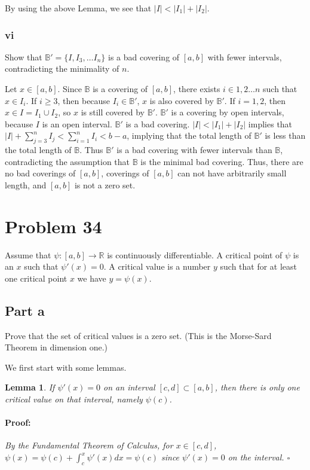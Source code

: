 \documentclass{article}
\newenvironment{proof}{\paragraph{Proof:}}{\hfill$\square$}
\newtheorem{lemma}[theorem]{Lemma}
\newcommand{\R}{\mathbb{R}}
\newcommand{\B}{\mathbb{B}}
\begin{document}
By using the above Lemma, we see that $|I| < |I_1| + |I_2|$.

\subsubsection*{vi}

Show that $\B' = \{I, I_3, \dots I_n\}$ is a bad covering of $[a, b]$ with fewer intervals, contradicting the minimality of $n$.

Let $x \in [a, b]$. Since $\B$ is a covering of $[a, b]$, there exists $i \in 1, 2 \dots n$ such that $x \in I_i$. If $i \geq 3$, then because $I_i \in \B'$, $x$ is also covered by $\B'$. If $i = 1, 2$, then $x \in I = I_1 \cup I_2$, so $x$ is still covered by $\B'$. $\B'$ is a covering by open intervals, because $I$ is an open interval. $\B'$ is a bad covering. $|I| < |I_1| + |I_2|$ implies that $|I| + \sum_{j=3}^n I_j < \sum_{i=1}^n I_i < b-a$, implying that the total length of $\B'$ is less than the total length of $\B$. Thus $\B'$ is a bad covering with fewer intervals than $\B$, contradicting the assumption that $\B$ is the minimal bad covering. Thus, there are no bad coverings of $[a, b]$, coverings of $[a, b]$ can not have arbitrarily small length, and $[a, b]$ is not a zero set.

\section*{Problem 34}

Assume that $\psi: [a, b] \rightarrow \R$ is continuously differentiable. A critical point of $\psi$ is an $x$ such that $\psi'(x) = 0$. A critical value is a number $y$ such that for at least one critical point $x$ we have $y = \psi(x)$.

\subsection*{Part a}

Prove that the set of critical values is a zero set. (This is the Morse-Sard Theorem in dimension one.)

We first start with some lemmas.

\begin{lemma}
If $\psi'(x) = 0$ on an interval $[c, d] \subset [a, b]$, then there is only one critical value on that interval, namely $\psi(c)$.

\begin{proof}
By the Fundamental Theorem of Calculus, for $x \in [c, d]$, $\psi(x) = \psi(c) + \int_c^x \psi'(x) dx = \psi(c)$ since $\psi'(x) = 0$ on the interval. 
\end{proof}
\end{lemma}
\end{document}
